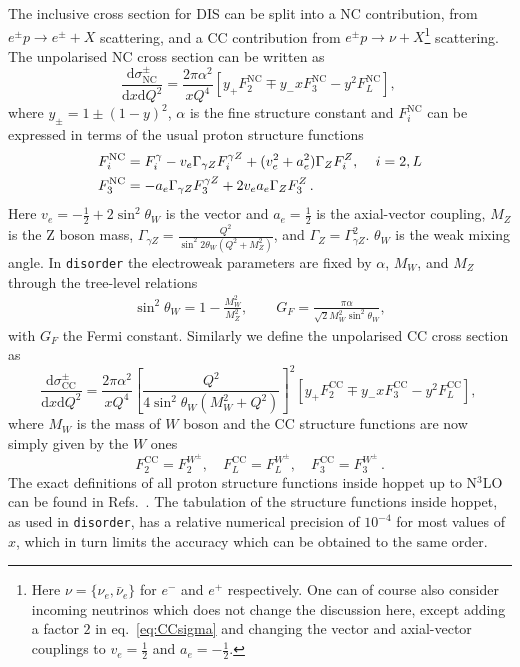 \documentclass[submission, PhysCodeb]{SciPost_better_arXiv}
\newcommand{\hoppet}{{\sc hoppet}}
\newcommand{\disorder}{{\tt disorder}}
\newcommand{\dd}{\mathrm{d}}
\newcommand{\NC}{\mathrm{NC}}
\newcommand{\CC}{\mathrm{CC}}
\newcommand{\NNNLO}{N$^3$LO}
\begin{document}
The inclusive cross section for DIS can be split into a NC
contribution, from $e^\pm p \to e^\pm + X$ scattering, and a CC
contribution from $e^\pm p \to \nu + X$\footnote{Here
$\nu=\{\nu_e,\bar{\nu}_e\}$ for $e^-$ and $e^+$ respectively. One can
of course also consider incoming neutrinos which does not change the
discussion here, except adding a factor $2$ in eq.~\eqref{eq:CCsigma}
and changing the vector and axial-vector couplings to $v_e = \frac12$
and $a_e=-\frac12$.} scattering. The unpolarised NC cross section can
be written as
\begin{equation}
\frac{\dd\sigma_{\NC}^\pm}{\dd x \dd Q^2} =   \frac{2\pi\alpha^2}{xQ^4} \left[y_+ F_2^{\NC} \mp y_- x F_3^\NC - y^2 F_L^\NC\right],\,
\label{eq:NCsigma}
\end{equation}
where $y_\pm=1\pm(1-y)^2$, $\alpha$ is the fine structure constant and
$F_i^\NC$ can be expressed in terms of the usual proton structure
functions
\begin{align}
  F_{i}^\NC &= F_{i}^\gamma  - v_e \Gamma_{\gamma Z} F_{i}^{\gamma Z} + (v_e^2 + a_e^2)\Gamma_{Z} F_{i}^{Z},\, \quad i =2,L \\ \notag
  F_{3}^\NC &= - a_e \Gamma_{\gamma Z} F_{3}^{\gamma Z} + 2v_e a_e\Gamma_{Z} F_{3}^{Z}\,.
\end{align}
Here $v_e = -\frac12 + 2 \sin^2\theta_W$ is the vector and
$a_e=\frac12$ is the axial-vector coupling, $M_Z$ is the Z boson mass,
$\Gamma_{\gamma Z} = \frac{Q^2}{\sin^2 2\theta_W(Q^2+M_Z^2)}$, and
$\Gamma_Z=\Gamma_{\gamma Z}^2$. $\theta_W$ is the weak mixing
angle. In \disorder{} the electroweak parameters are fixed by
$\alpha$, $M_W$, and $M_Z$ through the tree-level relations
\begin{align}
  \sin^2\theta_W = 1-\frac{M_W^2}{M_Z^2}, \qquad G_F = \frac{\pi\alpha}{\sqrt{2}M_W^2\sin^2\theta_W},
\end{align}
with $G_F$ the Fermi constant. Similarly we define the unpolarised CC
cross section as
\begin{equation}
\frac{\dd\sigma_{\CC}^\pm}{\dd x \dd Q^2} =   \frac{2\pi\alpha^2}{xQ^4}\left[\frac{Q^2}{4\sin^2\theta_W(M_W^2 + Q^2)}\right]^2 \left[y_+ F_2^{\CC} \mp y_- x F_3^\CC - y^2 F_L^\CC\right],\,
\label{eq:CCsigma}
\end{equation}
where $M_W$ is the mass of $W$ boson and the CC structure functions
are now simply given by the $W$ ones
\begin{equation}
  F_2^\CC = F_2^{W^\pm}, \quad   F_L^\CC = F_L^{W^\pm}, \quad   F_3^\CC = F_3^{W^\pm}\,.
\end{equation}
The exact definitions of all proton structure functions inside
\hoppet{} up to \NNNLO{} can be found in
Refs.~\cite{Salam:2008qg,hoppetv130,BertoneKarlberg}. The tabulation of the
structure functions inside \hoppet{}, as used in \disorder{}, has a
relative numerical precision of $10^{-4}$ for most values of $x$,
which in turn limits the accuracy which can be obtained to the same
order.
\end{document}
